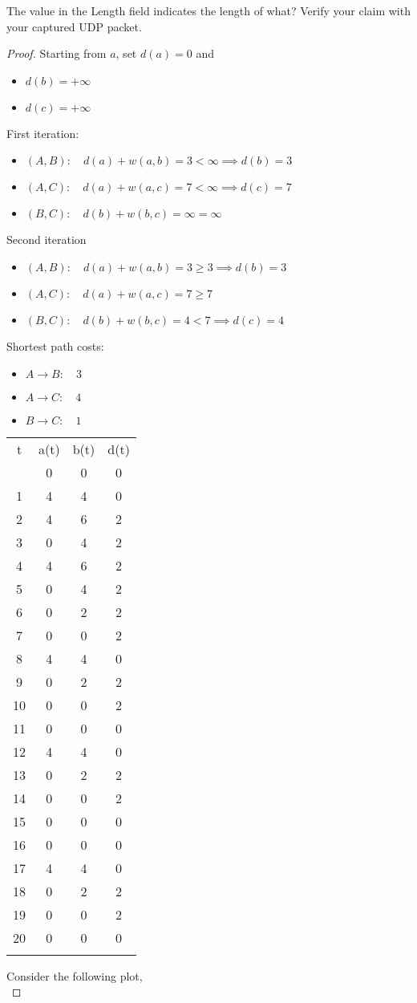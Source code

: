 \documentclass[../../main.tex]{subfiles}
\begin{document}
\begin{wts}
The value in the Length field indicates the length of what? Verify your claim with your captured UDP packet. 
\end{wts}
\begin{proof}
    Starting from $a$, set $d(a) = 0$ and 
\begin{itemize}
    \item $d(b)=+\infty$
    \item $d(c)=+\infty$
\end{itemize}
First iteration:
\begin{itemize}
    \item $(A,B):\quad d(a) + w(a,b) = 3<\infty\implies d(b) = 3$
    \item $(A,C):\quad d(a) + w(a,c) = 7<\infty\implies d(c) = 7$
    \item $(B,C):\quad d(b) + w(b,c) = \infty=\infty$
\end{itemize}
Second iteration
\begin{itemize}
    \item $(A,B):\quad d(a) + w(a,b) = 3\geq3\implies d(b) = 3$
    \item $(A,C):\quad d(a) + w(a,c) = 7\geq7$
    \item $(B,C):\quad d(b) + w(b,c) = 4<7\implies d(c)=4$
\end{itemize}
Shortest path costs:
\begin{itemize}
    \item $A\to B:\quad 3$
    \item $A\to C:\quad 4$
    \item $B\to C:\quad 1$
\end{itemize}
\begin{center}
    \begin{tabularx}{\textwidth}{cccc}
    \cmidrule[0.75pt](r){1-4}\addlinespace[0.2em]
    t&a(t)&b(t)&d(t)\tabularnewline \cmidrule[0.5pt](r){1-4}\addlinespace[0.2em]
    0&0&0&0\tabularnewline
    1&4&4&0\tabularnewline
    2&4&6&2\tabularnewline
    3&0&4&2\tabularnewline
    4&4&6&2\tabularnewline
    5&0&4&2\tabularnewline
    6&0&2&2\tabularnewline
    7&0&0&2\tabularnewline
    8&4&4&0\tabularnewline
    9&0&2&2\tabularnewline
    10&0&0&2\tabularnewline
    11&0&0&0\tabularnewline
    12&4&4&0\tabularnewline
    13&0&2&2\tabularnewline
    14&0&0&2\tabularnewline
    15&0&0&0\tabularnewline
    16&0&0&0\tabularnewline
    17&4&4&0\tabularnewline
    18&0&2&2\tabularnewline
    19&0&0&2\tabularnewline
    20&0&0&0\tabularnewline
    
    \cmidrule[0.75pt](r){1-4}\addlinespace[0.2em]
    \end{tabularx}\label{F9 DATA}
\end{center}
Consider the following plot,\\
\end{proof}
\end{document}
